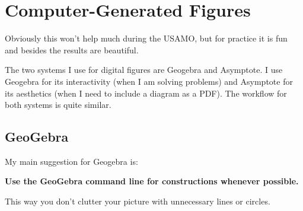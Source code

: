\documentclass[11pt]{scrartcl}
\begin{document}
\section{Computer-Generated Figures}
Obviously this won't help much during the USAMO,
but for practice it is fun and besides the results are beautiful.

The two systems I use for digital figures are Geogebra and Asymptote.
I use Geogebra for its interactivity (when I am solving problems)
and Asymptote for its aesthetics (when I need to include a diagram as a PDF).
The workflow for both systems is quite similar.

\subsection{GeoGebra}
My main suggestion for Geogebra is:
\begin{mdframed}
  \bfseries\color{red}
  Use the GeoGebra command line for constructions whenever possible.
\end{mdframed}
This way you don't clutter your picture with unnecessary lines or circles.
\end{document}
